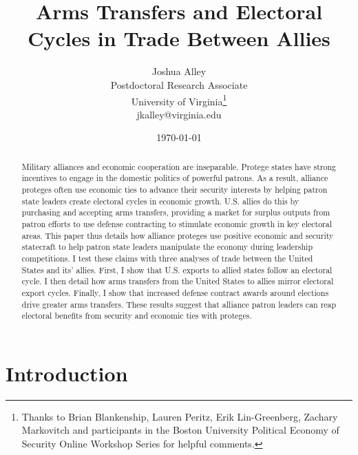 \documentclass[12pt]{article}
\title{\textbf{Arms Transfers and Electoral Cycles in Trade Between Allies}}
\author{Joshua Alley \\
Postdoctoral Research Associate \\
University of Virginia\thanks{Thanks to Brian Blankenship, Lauren Peritz, Erik Lin-Greenberg, Zachary Markovitch and participants in the Boston University Political Economy of Security Online Workshop Series for helpful comments.} \\
jkalley@virginia.edu
}
\date{\today}
\begin{document}
\maketitle 

\begin{abstract}
Military alliances and economic cooperation are inseparable. 
Protege states have strong incentives to engage in the domestic politics of powerful patrons. 
As a result, alliance proteges often use economic ties to advance their security interests by helping patron state leaders create electoral cycles in economic growth. 
U.S. allies do this by purchasing and accepting arms transfers, providing a market for surplus outputs from patron efforts to use defense contracting to stimulate economic growth in key electoral areas.
This paper thus details how alliance proteges use positive economic and security statecraft to help patron state leaders manipulate the economy during leadership competitions.  
I test these claims with three analyses of trade between the United States and its' allies. 
First, I show that U.S. exports to allied states follow an electoral cycle. 
I then detail how arms transfers from the United States to allies mirror electoral export cycles. 
Finally, I show that increased defense contract awards around elections drive greater arms transfers.
These results suggest that alliance patron leaders can reap electoral benefits from security and economic ties with proteges. 
\end{abstract} 


\newpage 
\doublespace 


\section{Introduction}

\end{document}
